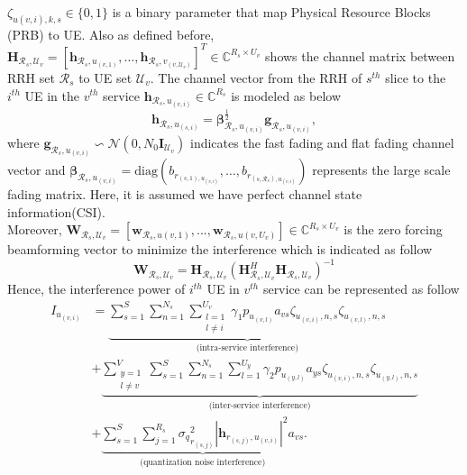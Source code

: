 \documentclass[conference]{IEEEtran}
\begin{document}
$\zeta_{u(v,i),k,s} \in \{0,1\}$ is a binary parameter that map Physical Resource Blocks (PRB) to UE.
Also as defined before, $\boldsymbol{H}_{\mathcal{R}_s,\mathcal{U}_v}=\left[\boldsymbol{h}_{\mathcal{R}_s,u_{(v,1)}},\ldots,\boldsymbol{h}_{\mathcal{R}_s,v_{(v,\mathcal{U}_v)}}\right]^T  \in \mathbb{C}^{{R}_s\times {U}_v }$ 
shows the channel matrix between RRH set $\mathcal{R}_s$ to UE set
$\mathcal{U}_v$. 
The channel vector from the RRH of  $s^{th}$ slice to the $i^{th}$ UE in the $v^{th}$ service $\boldsymbol{h}_{\mathcal{R}_s,u_{(v,i)}}\in \mathbb{C}^{{R}_s}$ is modeled as below
\begin{equation}
\boldsymbol{h}_{\mathcal{R}_s,u_{(s,i)}} = \boldsymbol{\beta}^\frac{1}{2}_{\mathcal{R}_s,u_{(v,i)}} \boldsymbol{g}_{\mathcal{R}_s,u_{(v,i)}},
\end{equation}
where $\boldsymbol{g}_{\mathcal{R}_s,u_{(v,i)}} \backsim \mathcal{N}(0,N_0\boldsymbol{I}_{\mathcal{U}_v})$ indicates the fast fading and flat fading channel vector and $\boldsymbol{\beta}_{\mathcal{R}_s,u_{(v,i)}}=\text{diag}(b_{r_{(s,1),u_{(v,i)}}},\ldots,b_{r_{(s,\mathcal{R}_s),u_{(v,i)}}})$
represents the large scale fading matrix. Here, it is assumed we have perfect channel state information(CSI).
\\
Moreover, $\boldsymbol{W}_{\mathcal{R}_s,\mathcal{U}_v} = [\boldsymbol{w}_{\mathcal{R}_s,u(v,1)},...,\boldsymbol{w}_{\mathcal{R}_s,u(v,U_v)}] \in \mathbb{C}^{{R}_s\times U_v} $ is the zero forcing beamforming vector to minimize the interference which is indicated as follow
\begin{equation}
\boldsymbol{W}_{\mathcal{R}_s,\mathcal{U}_v} = \boldsymbol{H}_{\mathcal{R}_s,\mathcal{U}_v}(\boldsymbol{H}_{\mathcal{R}_s,\mathcal{U}_v}^H \boldsymbol{H}_{\mathcal{R}_s,\mathcal{U}_v})^{-1}
\end{equation}
Hence, the interference power of $i^{th}$ UE in $v^{th}$ service can be represented as follow
\begin{equation}
\begin{split}
 I_{u_{(v,i)}} &= 
 \underbrace{\sum_{s=1}^{S}\sum_{n=1}^{N_s}\sum_{\substack{l=1 \\ l\neq i}}^{{U}_v} \gamma_{1}  p_{u_{(v,l)}}a_{vs}\zeta_{u_(v,i),n,s}\zeta_{u_(v,l),n,s}}_{\text{(intra-service interference)}}\\
&+ \underbrace{\sum_{\substack{y=1 \\ l\neq v}}^{V}\sum_{s=1}^{S}\sum_{n=1}^{N_s}\sum_{l=1}^{{U}_y} \gamma_{2}  p_{u_{(y,l)}}a_{ys} \zeta_{u_(v,i),n,s}\zeta_{u_(y,l),n,s}}_{\text{(inter-service interference)}}\\
&+\underbrace{ \sum_{s=1}^{S} \sum_{j=1}^{{R}_s} {\sigma_q}_{r_{(s,j)}}^2 |\boldsymbol{h}_{r_{(s,j)}, u_{(v,i)}}|^2 a_{vs}}_{\text{(quantization noise interference)}}.
\end{split}
\end{equation}
\end{document}
